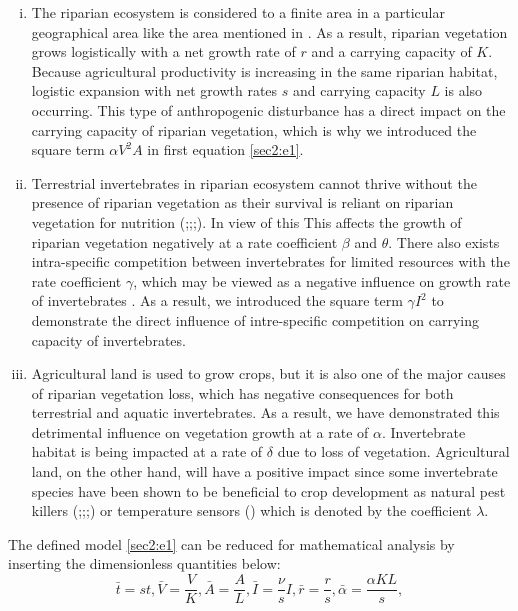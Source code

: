 \documentclass[12pt]{article}
\numberwithin{equation}{section}
\begin{document}
\begin{enumerate}[i).]
\item The riparian ecosystem is considered to a finite area in a particular geographical area like the area mentioned in \cite{popescu2021riparian}. As a result, riparian vegetation grows logistically with a net growth rate of $r$ and a carrying capacity of $K$. Because agricultural productivity is increasing in the same riparian habitat, logistic expansion with net growth rates $s$ and carrying capacity $L$ is also occurring. This type of anthropogenic disturbance has a direct impact on the carrying capacity of riparian vegetation, which is why we introduced the square term $\alpha V^2A$ in first equation \eqref{sec2:e1}.
\item Terrestrial invertebrates in riparian ecosystem cannot thrive without the presence of riparian vegetation as their survival is reliant on riparian vegetation for nutrition (\cite{popescu2021riparian};\cite{edwards1996effect};\cite{ramey2017terrestrial};\cite{forio2020small}). In view of this This affects the growth of riparian vegetation negatively at a rate coefficient $\beta$ and $\theta$. There also exists intra-specific competition between invertebrates for limited resources with the rate coefficient $\gamma$, which may be viewed as a negative influence on growth rate of invertebrates \cite{ruetz2003interspecific}. As a result, we introduced the square term $\gamma I^2$ to demonstrate the direct influence of intre-specific competition on carrying capacity of invertebrates.
\item Agricultural land is used to grow crops, but it is also one of the major causes of riparian vegetation loss, which has negative consequences for both terrestrial and aquatic invertebrates. As a result, we have demonstrated this detrimental influence on vegetation growth at a rate of $\alpha$. Invertebrate habitat is being impacted at a rate of $\delta$ due to loss of vegetation. Agricultural land, on the other hand, will have a positive impact since some invertebrate species have been shown to be beneficial to crop development as natural pest killers (\cite{krell2015aquatic};\cite{riis2020global};\cite{stockan2014effects};\cite{cole2012riparian}) or temperature sensors (\cite{greenwood1995patial}) which is denoted by the coefficient $\lambda$.
\end{enumerate}
The defined model \eqref{sec2:e1} can be reduced for mathematical analysis by inserting the dimensionless quantities below:\\
\begin{equation*}
\bar t=st, \bar V=\frac{V}{K}, \bar A=\frac{A}{L}, \bar I=\frac{\nu}{s}I, \bar r=\frac{r}{s}, \bar \alpha=\frac{\alpha KL}{s},
\end{equation*}
\end{document}
